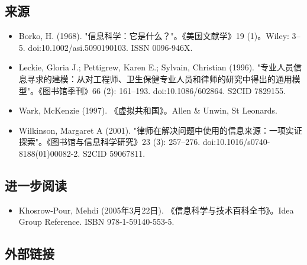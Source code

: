 \subsection{来源} 
\begin{itemize}
\item Borko, H. (1968). "信息科学：它是什么？"。《美国文献学》19 (1)。Wiley: 3–5. doi:10.1002/asi.5090190103. ISSN 0096-946X.  
\item Leckie, Gloria J.; Pettigrew, Karen E.; Sylvain, Christian (1996). "专业人员信息寻求的建模：从对工程师、卫生保健专业人员和律师的研究中得出的通用模型"。《图书馆季刊》66 (2): 161–193. doi:10.1086/602864. S2CID 7829155.  
\item Wark, McKenzie (1997). 《虚拟共和国》。Allen & Unwin, St Leonards.  
\item Wilkinson, Margaret A (2001). "律师在解决问题中使用的信息来源：一项实证探索"。《图书馆与信息科学研究》23 (3): 257–276. doi:10.1016/s0740-8188(01)00082-2. S2CID 59067811.  
\end{itemize}
\subsection{进一步阅读 } 
\begin{itemize}
\item Khosrow-Pour, Mehdi (2005年3月22日). 《信息科学与技术百科全书》。Idea Group Reference. ISBN 978-1-59140-553-5.
\end{itemize}
\subsection{外部链接}
